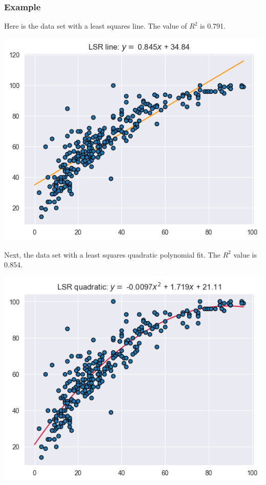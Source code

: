 \documentclass{beamer}
\theoremstyle{example}
\begin{document}
\begin{frame}
    \frametitle{Example}
    Here is the data set with a least squares line. The value of $R^2$ is 0.791. 
\begin{center}
    \includegraphics[height=0.35\textheight]{../../Images/CollegeTop25ontoTop10_deg1.png}
\end{center}

    \pause 
    Next, the data set with a least squares quadratic polynomial fit. The $R^2$ value is 0.854.

\begin{center}
    \includegraphics[height=0.35\textheight]{../../Images/CollegeTop25ontoTop10_deg2.png}
\end{center}
\end{frame}
\end{document}
